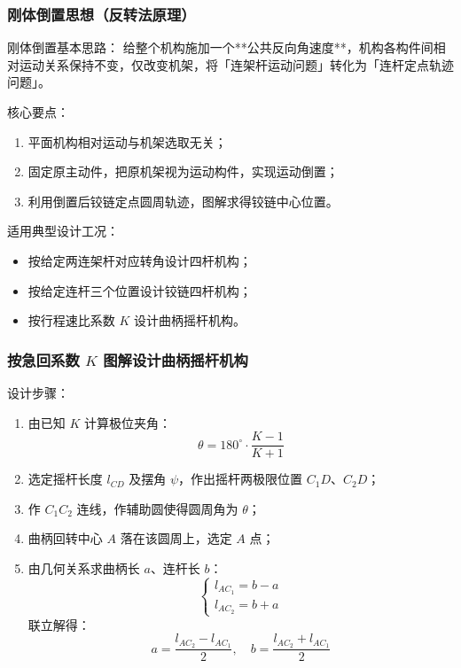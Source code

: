 \subsubsection{刚体倒置思想（反转法原理）}
\label{sec:inversion}
刚体倒置基本思路：
给整个机构施加一个**公共反向角速度**，机构各构件间相对运动关系保持不变，仅改变机架，将「连架杆运动问题」转化为「连杆定点轨迹问题」。

核心要点：
\begin{enumerate}
	\item 平面机构相对运动与机架选取无关；
	\item 固定原主动件，把原机架视为运动构件，实现运动倒置；
	\item 利用倒置后铰链定点圆周轨迹，图解求得铰链中心位置。
\end{enumerate}

适用典型设计工况：
\begin{itemize}
	\item 按给定两连架杆对应转角设计四杆机构；
	\item 按给定连杆三个位置设计铰链四杆机构；
	\item 按行程速比系数 $K$ 设计曲柄摇杆机构。
\end{itemize}

\subsubsection{按急回系数 $K$ 图解设计曲柄摇杆机构}
设计步骤：
\begin{enumerate}
	\item 由已知 $K$ 计算极位夹角：
	\[
	\theta = 180^\circ \cdot \dfrac{K-1}{K+1}
	\]
	\item 选定摇杆长度 $l_{CD}$ 及摆角 $\psi$，作出摇杆两极限位置 $C_1D$、$C_2D$；
	\item 作 $C_1C_2$ 连线，作辅助圆使得圆周角为 $\theta$；
	\item 曲柄回转中心 $A$ 落在该圆周上，选定 $A$ 点；
	\item 由几何关系求曲柄长 $a$、连杆长 $b$：
	\[
	\begin{cases}
		l_{AC_1} = b - a\\
		l_{AC_2} = b + a
	\end{cases}
	\]
	联立解得：
	\[
	a = \dfrac{l_{AC_2}-l_{AC_1}}{2},\quad 
	b = \dfrac{l_{AC_2}+l_{AC_1}}{2}
	\]
\end{enumerate}


